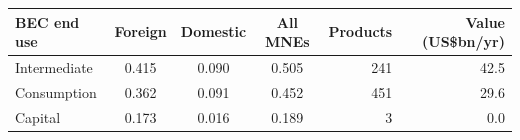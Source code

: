 \begin{tabular}{lcccrr}
\toprule
BEC end use & Foreign & Domestic & All MNEs & Products & Value (US\$bn/yr) \\
\midrule
Intermediate & 0.415 & 0.090 & 0.505 & 241 & 42.5 \\
Consumption & 0.362 & 0.091 & 0.452 & 451 & 29.6 \\
Capital & 0.173 & 0.016 & 0.189 & 3 & 0.0 \\
\bottomrule
\end{tabular}
